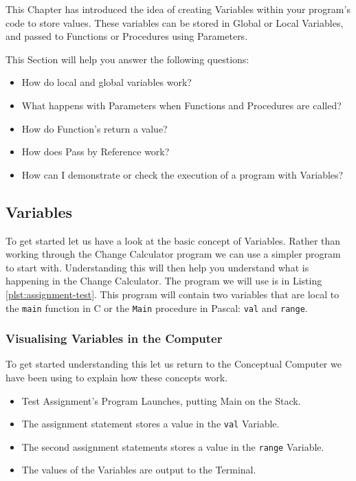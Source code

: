 This Chapter has introduced the idea of creating Variables within your program's code to store values. These variables can be stored in Global or Local Variables, and passed to Functions or Procedures using Parameters.

This Section will help you answer the following questions:
\begin{itemize}
  \item How do local and global variables work?
  \item What happens with Parameters when Functions and Procedures are called?
  \item How do Function's return a value?
  \item How does Pass by Reference work?
  \item How can I demonstrate or check the execution of a program with Variables?
\end{itemize}

\subsection{Variables} %
\label{sub:visualise_variables}

To get started let us have a look at the basic concept of Variables. Rather than working through the Change Calculator program we can use a simpler program to start with. Understanding this will then help you understand what is happening in the Change Calculator. The program we will use is in Listing \ref{plst:assignment-test}. This program will contain two variables that are local to the \texttt{main} function in C or the \texttt{Main} procedure in Pascal: \texttt{val} and \texttt{range}.



\subsubsection{Visualising Variables in the Computer} %
\label{ssub:visualising_variables_in_the_computer}

To get started understanding this let us return to the Conceptual Computer we have been using to explain how these concepts work.

\begin{itemize}
  \item Test Assignment's Program Launches, putting Main on the Stack.
  \item The assignment statement stores a value in the \texttt{val} Variable.
  \item The second assignment statements stores a value in the \texttt{range} Variable.
  \item The values of the Variables are output to the Terminal.
\end{itemize}

